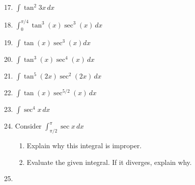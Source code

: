 \documentclass[12pt]{article}
\newif\ifans
\begin{document}
\begin{enumerate}
\setcounter{enumi}{16}

\item $\int \tan^2{3x}\,dx$ 

\ifans{\fbox{$-x+\frac{1}{3}\tan{(3x)}+C$}} \fi

\item $\int_0^{\pi/4} \tan^{3}{(x)}\sec^3{(x)}\,dx$  

\ifans{\fbox{$\frac{2}{15}\left(1+\sqrt{2}\right)$}} \fi

\item $\int \tan{(x)}\sec^3{(x)}dx$ 

\ifans{\fbox{$\frac{1}{3}\sec^3{x}+C$}} \fi

\item $\int \tan^3{(x)}\sec^4{(x)\,}dx$ 

\ifans{\fbox{$\frac{1}{6}\tan^6{x}+\frac{1}{4}\tan^{4}{x}+C$}} \fi

\item $\int \tan^5{(2x)}\sec^2{(2x)}\,dx$ 

\ifans{\fbox{$\frac{1}{12}\tan^6{(2x)}+C$}} \fi

\item $\int \tan{(x)}\sec^{5/2}{(x)}\,dx$ 

\ifans{\fbox{$\frac{2}{5}\sec^{5/2}{x}+C$}} \fi

\item $\int \sec^{4}{x}\,dx$ 

\ifans{\fbox{$\frac{1}{3}\tan^3{x}+\tan{x}+C$}} \fi

\item Consider $\int_{\pi/2}^\pi \sec{x} \,dx$

\begin{enumerate}

\item Explain why this integral is improper.

\ifans{\fbox{\parbox{1\linewidth}{The integral is improper because $\sec{x}$ has an infinite discontinuity at $x=\frac{\pi}{2}$ which is the lower limit of integration.}}} \fi

\item Evaluate the given integral.  If it diverges, explain why.

\ifans{\fbox{The integral diverges because $\int_{\pi/2}^{\pi} \sec{x} \,dx = -\infty$}} \fi

\end{enumerate}

\item \begin{enumerate}


\end{enumerate}
\end{enumerate}
\end{document}
